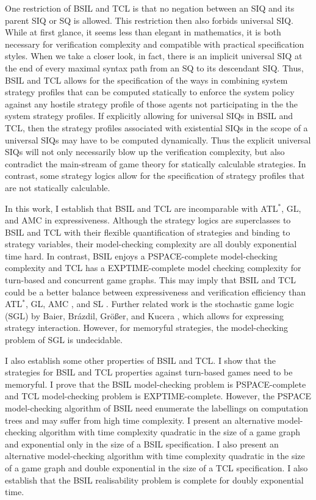 One restriction of BSIL and TCL is that no negation between an SIQ and its parent SIQ or SQ is allowed. 
This restriction then also forbids universal SIQ.  
While at first glance, it seems less than elegant in mathematics, it is both necessary for verification complexity and compatible with practical specification styles.  
When we take a closer look, in fact, there is an implicit universal SIQ at the end of every maximal syntax path from an SQ to its descendant SIQ.
Thus, BSIL and TCL allows for the specification of the ways in combining system strategy profiles that can be computed statically to enforce the system policy against any hostile strategy profile of those agents not participating in the the system strategy profiles.  
If explicitly allowing for universal SIQs in BSIL and TCL, then the strategy profiles associated with existential SIQs in the scope of a universal SIQs may have to be computed dynamically.  
Thus the explicit universal SIQs will not only necessarily blow up the verification complexity, but also contradict the main-stream of game theory for statically calculable strategies.  
In contrast, some strategy logics \cite{MMV10} allow for the specification of strategy profiles that are not statically calculable. 

In this work, I establish that BSIL and TCL are incomparable with ATL$^*$, GL, and AMC in expressiveness.  
Although the strategy logics \cite{CHP10,CLM10,MMV10} are superclasses to BSIL and TCL with their flexible quantification of strategies and binding to strategy variables, their model-checking complexity are all doubly exponential time hard.  
In contrast, BSIL enjoys a PSPACE-complete model-checking complexity and TCL has a EXPTIME-complete model checking complexity for turn-based and concurrent game graphs.  
This may imply that BSIL and TCL could be a better balance between expressiveness and verification efficiency than ATL$^*$, GL, AMC \cite{AHK02}, and SL \cite{CHP10,MMV10}.
Further related work is the stochastic game logic (SGL) by Baier, Br\'azdil, Gr\"o{\ss}er, and Kucera \cite{BBGK07}, which allows for expressing strategy interaction.
However, for memoryful strategies, the model-checking problem of SGL is undecidable. 

I also establish some other properties of BSIL and TCL. 
I show that the strategies for BSIL and TCL properties against turn-based games need to be memoryful.
I prove that the BSIL model-checking problem is PSPACE-complete and TCL model-checking problem is EXPTIME-complete.  
However, the PSPACE model-checking algorithm of BSIL need enumerate the labellings on computation trees and may suffer from high time complexity.
I present an alternative model-checking algorithm with time complexity quadratic in the size of a game graph and exponential only in the size of a BSIL specification.
I also present an alternative model-checking algorithm with time complexity quadratic in the size of a game graph and  double exponential in the size of a TCL specification.
I also establish that the BSIL realisability problem is complete for doubly exponential time.

